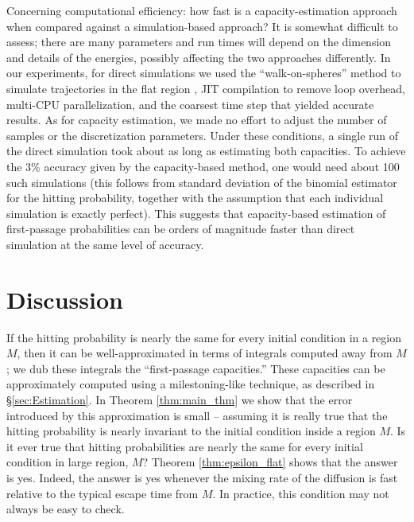 \documentclass[12pt, nofootinbib,english, amsmath, amssymb, aps, priprint, graphicx,floatfix,draft]{revtex4-1}
\theoremstyle{plain}
\theoremstyle{definition}
\theoremstyle{plain}
\begin{document}
Concerning computational efficiency: how fast is a capacity-estimation approach when compared against a simulation-based approach?  It is somewhat difficult to assess; there are many parameters and run times will depend on the dimension and details of the energies, possibly affecting the two approaches differently. In our experiments, for direct simulations we used the ``walk-on-spheres'' method to simulate trajectories in the flat region \cite{bingham1972random}, JIT compilation to remove loop overhead, multi-CPU parallelization, and the coarsest time step that yielded accurate results. As for capacity estimation, we made no effort to adjust the number of samples or the discretization parameters. Under these conditions, a single run of the direct simulation took about as long as estimating both capacities.  To achieve the 3\% accuracy given by the capacity-based method, one would need about 100 such simulations (this follows from standard deviation of the binomial estimator for the hitting probability, together with the assumption that each individual simulation is exactly perfect). This suggests that capacity-based estimation of first-passage probabilities can be orders of magnitude faster than direct simulation at the same level of accuracy.





\section{Discussion}
\label{sec:Discussion}

If the hitting probability is nearly the same for every initial condition in a region $M$, then it can be well-approximated in terms of integrals computed away from $M$; we dub these integrals the ``first-passage capacities.''  These capacities can be approximately computed using a milestoning-like technique, as described in \S\ref{sec:Estimation}.  In Theorem \ref{thm:main_thm} we show that the error introduced by this approximation is small -- assuming it is really true that the hitting probability is nearly invariant to the initial condition inside a region $M$.  Is it ever true that hitting probabilities are nearly the same for every initial condition in large region, $M$?  Theorem \ref{thm:epsilon_flat} shows that the answer is yes.  Indeed, the answer is yes whenever the mixing rate of the diffusion is fast relative to the typical escape time from $M$.  In practice, this condition may not always be easy to check.
\end{document}

